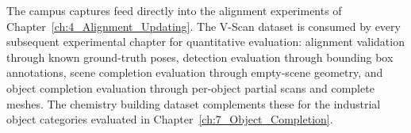 The campus captures feed directly into the alignment experiments of Chapter~\ref{ch:4_Alignment_Updating}. The V-Scan dataset is consumed by every subsequent experimental chapter for quantitative evaluation: alignment validation through known ground-truth poses, detection evaluation through bounding box annotations, scene completion evaluation through empty-scene geometry, and object completion evaluation through per-object partial scans and complete meshes. The chemistry building dataset complements these for the industrial object categories evaluated in Chapter~\ref{ch:7_Object_Completion}.

\cleardoublepage